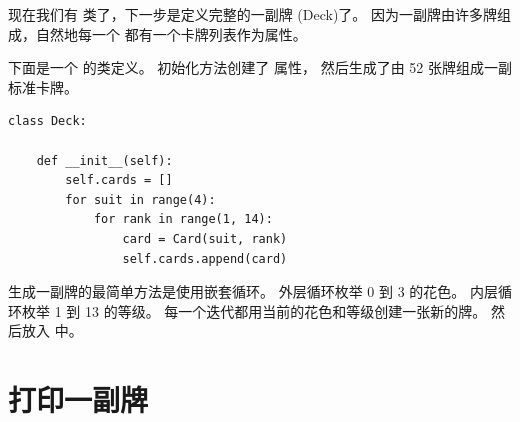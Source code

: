 

现在我们有  类了，下一步是定义完整的一副牌 (Deck)了。  
因为一副牌由许多牌组成，自然地每一个  都有一个卡牌列表作为属性。



下面是一个  的类定义。  
初始化方法创建了  属性， 然后生成了由 52 张牌组成一副标准卡牌。

  
  

\begin{lstlisting}
class Deck:

    def __init__(self):
        self.cards = []
        for suit in range(4):
            for rank in range(1, 14):
                card = Card(suit, rank)
                self.cards.append(card)
\end{lstlisting}


生成一副牌的最简单方法是使用嵌套循环。  
外层循环枚举 0 到 3 的花色。  
内层循环枚举 1 到 13 的等级。  
每一个迭代都用当前的花色和等级创建一张新的牌。  
然后放入  中。



\section{打印一副牌}

\label{printdeck}


